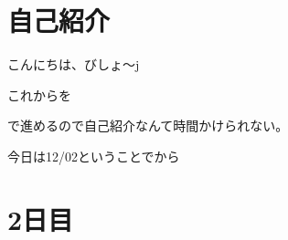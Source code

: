 \skipnexttoc
\section{自己紹介}
\begin{frame}
	こんにちは、びしょ〜j

	\pause
	\bgroup\Huge
	\vspace{1\zw}
	これから\alert{}を

	で進めるので自己紹介なんて時間かけられない。
	\vspace{1\zw}
	\egroup

	今日は12/02ということでから
\end{frame}
\section{2日目}
